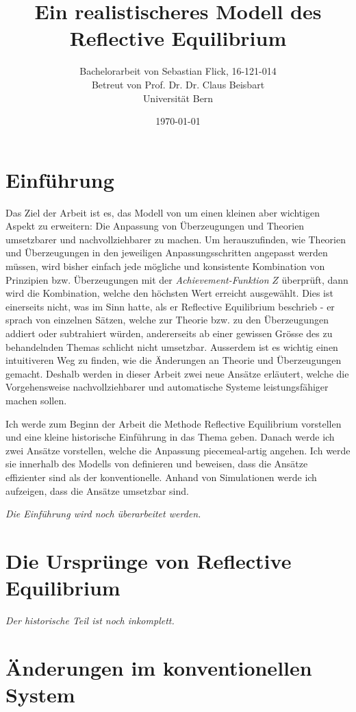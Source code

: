 \documentclass{article}
\title{Ein realistischeres Modell des Reflective Equilibrium}
\author{Bachelorarbeit von Sebastian Flick, 16-121-014\\Betreut von Prof. Dr. Dr. Claus Beisbart\\Universität Bern}
\date{\today}
\begin{document}
\maketitle
\section{Einführung}
Das Ziel der Arbeit ist es, das Modell von \autocite{beisbart_making_2015} um einen kleinen aber wichtigen Aspekt zu erweitern: Die Anpassung von Überzeugungen und Theorien umsetzbarer und nachvollziehbarer zu machen. Um herauszufinden, wie Theorien und Überzeugungen in den jeweiligen Anpassungsschritten angepasst werden müssen, wird bisher einfach jede mögliche und konsistente Kombination von Prinzipien bzw. Überzeugungen mit der \textit{Achievement-Funktion} $Z$ überprüft, dann wird die Kombination, welche den höchsten Wert erreicht ausgewählt. Dies ist einerseits nicht, was \citeauthor{goodman_fact_1983} im Sinn hatte, als er Reflective Equilibrium beschrieb - er sprach von einzelnen Sätzen, welche zur Theorie bzw. zu den Überzeugungen addiert oder subtrahiert würden, andererseits ab einer gewissen Grösse des zu behandelnden Themas schlicht nicht umsetzbar. Ausserdem ist es wichtig einen intuitiveren Weg zu finden, wie die Änderungen an Theorie und Überzeugungen gemacht. Deshalb werden in dieser Arbeit zwei neue Ansätze erläutert, welche die Vorgehensweise nachvollziehbarer und automatische Systeme leistungsfähiger machen sollen.

Ich werde zum Beginn der Arbeit die Methode Reflective Equilibrium vorstellen und eine kleine historische Einführung in das Thema geben. Danach werde ich zwei Ansätze vorstellen, welche die Anpassung piecemeal-artig angehen. Ich werde sie innerhalb des Modells von \citeauthor{beisbart_making_2015} definieren und beweisen, dass die Ansätze effizienter sind als der konventionelle. Anhand von Simulationen werde ich aufzeigen, dass die Ansätze umsetzbar sind.

\textit{Die Einführung wird noch überarbeitet werden.}
\section{Die Ursprünge von Reflective Equilibrium}

\textit{Der historische Teil ist noch inkomplett.}

\section{Änderungen im konventionellen System}
\end{document}
